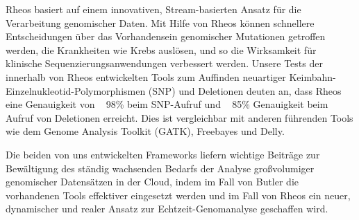 Rheos basiert auf einem innovativen, Stream-basierten Ansatz für die Verarbeitung genomischer Daten. Mit Hilfe von Rheos können schnellere Entscheidungen über das Vorhandensein genomischer Mutationen getroffen werden, die Krankheiten wie Krebs auslösen, und so die Wirksamkeit für klinische Sequenzierungsanwendungen verbessert werden. Unsere Tests der innerhalb von Rheos entwickelten Tools zum Auffinden neuartiger Keimbahn-Einzelnukleotid-Polymorphismen (SNP) und Deletionen deuten an, dass Rheos eine Genauigkeit von ~ 98\% beim SNP-Aufruf und ~ 85\% Genauigkeit beim Aufruf von Deletionen erreicht. Dies ist vergleichbar mit anderen führenden Tools wie dem Genome Analysis Toolkit (GATK), Freebayes und Delly.

Die beiden von uns entwickelten Frameworks liefern wichtige Beiträge zur Bewältigung des ständig wachsenden Bedarfs der Analyse großvolumiger genomischer Datensätzen in der Cloud, indem im Fall von Butler die vorhandenen Tools effektiver eingesetzt werden und im Fall von Rheos ein neuer, dynamischer und realer Ansatz zur Echtzeit-Genomanalyse geschaffen wird.
 
\newpage
\null
\thispagestyle{empty}
\newpage